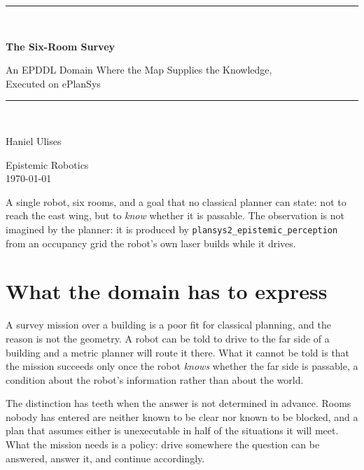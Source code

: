 \documentclass[11pt,a4paper]{article}
\theoremstyle{definition}
\newcommand{\code}[1]{\texttt{\small #1}}
\begin{document}
\begin{titlepage}
\centering
\vspace*{2.4cm}
{\color{rulegrey}\rule{\textwidth}{0.8pt}}\\[0.9cm]
{\LARGE\bfseries The Six-Room Survey\par}
\vspace{0.5cm}
{\large\color{slate} An EPDDL Domain Where the Map Supplies the Knowledge,\\ Executed on ePlanSys\par}
\vspace{0.7cm}
{\color{rulegrey}\rule{\textwidth}{0.8pt}}\\[1.4cm]

{\large Haniel Ulises\par}
\vspace{0.3cm}
{\color{slate} Epistemic Robotics}\\
\vspace{0.15cm}
{\color{slate}\today}

\vfill
{\color{slate}\small
A single robot, six rooms, and a goal that no classical planner can state:
not to reach the east wing, but to \emph{know} whether it is passable.
The observation is not imagined by the planner: it is produced by
\code{plansys2\_epistemic\_perception} from an occupancy grid the robot's own
laser builds while it drives.}
\vspace{1.2cm}
\end{titlepage}

\section{What the domain has to express}

A survey mission over a building is a poor fit for classical planning, and the
reason is not the geometry. A robot can be told to drive to the far side of a
building and a metric planner will route it there. What it cannot be told is
that the mission succeeds only once the robot \emph{knows} whether the far side
is passable, a condition about the robot's information rather than about the
world.

The distinction has teeth when the answer is not determined in advance. Rooms
nobody has entered are neither known to be clear nor known to be blocked, and a
plan that assumes either is unexecutable in half of the situations it will meet.
What the mission needs is a policy: drive somewhere the question can be
answered, answer it, and continue accordingly.
\end{document}
